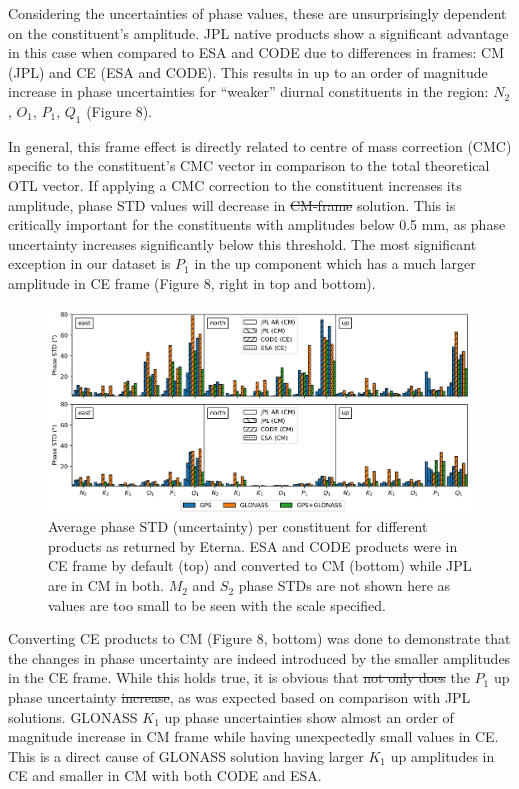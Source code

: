 \documentclass[se, manuscript]{copernicus}
\providecommand{\DIFadd}[1]{{\protect\color{blue}\uwave{#1}}} %
\providecommand{\DIFdel}[1]{{\protect\color{red}\sout{#1}}}                      %
\providecommand{\DIFaddbegin}{} %
\providecommand{\DIFaddend}{} %
\providecommand{\DIFdelbegin}{} %
\providecommand{\DIFdelend}{} %
\begin{document}
Considering the uncertainties of phase values, these are unsurprisingly dependent on the constituent’s amplitude. JPL native products show a significant advantage in this case when compared to ESA and CODE due to differences in frames: CM (JPL) and CE (ESA and CODE). This results in up to an order of magnitude increase in phase uncertainties for “weaker” diurnal constituents in the region: $N_2$, $O_1$, $P_1$, $Q_1$ (Figure 8).

In general, this frame effect is directly related to centre of mass correction (CMC) specific to the constituent's CMC vector in comparison to the total theoretical OTL vector. If applying a CMC correction to the constituent increases its amplitude, phase STD values will decrease in \DIFdelbegin \DIFdel{CM-frame }\DIFdelend \DIFaddbegin \DIFadd{a CM frame }\DIFaddend solution. This is critically important for the constituents with amplitudes below 0.5 mm, as phase uncertainty increases significantly below this threshold. The most significant exception in our dataset is $P_1$ in the up component which has a much larger amplitude in CE frame (Figure 8, right in top and bottom). 

\begin{figure}[t]
\includegraphics[width=17cm]{fig08.png}
\caption{Average phase STD (uncertainty) per constituent for different products as returned by Eterna. ESA and CODE products were in CE frame by default (top) and converted to CM (bottom) while JPL are in CM in both. $M_2$ and $S_2$ phase STDs are not shown here as values are too small to be seen with the scale specified.}
\end{figure}
\DIFaddbegin 

\DIFaddend Converting CE products to CM (Figure 8, bottom) was done to demonstrate that the changes in phase uncertainty are indeed introduced by the smaller amplitudes in the CE frame. While this holds true, it is obvious that \DIFdelbegin \DIFdel{not only does }\DIFdelend the $P_1$ up phase uncertainty \DIFdelbegin \DIFdel{increase}\DIFdelend \DIFaddbegin \DIFadd{increases}\DIFaddend , as was expected based on comparison with \DIFaddbegin \DIFadd{the }\DIFaddend JPL solutions. GLONASS $K_1$ up phase uncertainties show almost an order of magnitude increase in \DIFaddbegin \DIFadd{the }\DIFaddend CM frame while having unexpectedly small values in CE. This is a direct cause of GLONASS solution having larger $K_1$ up amplitudes in CE and smaller in CM with both CODE and ESA.
\end{document}
